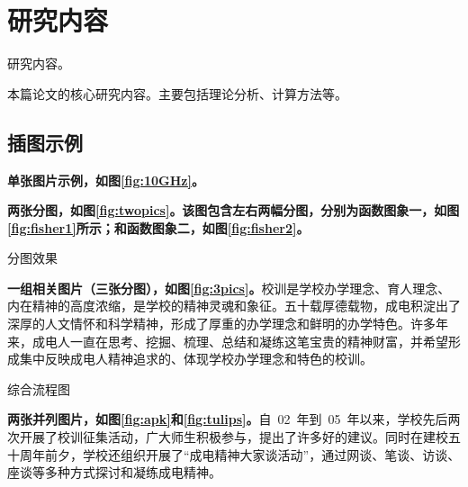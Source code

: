 
\chapter{研究内容}
	研究内容。
	
	本篇论文的核心研究内容。主要包括理论分析、计算方法等。

\section{插图示例}
    {\bfseries 单张图片示例，如图\ref{fig:10GHz}。}
    
    
    {\bfseries 两张分图，如图\ref{fig:twopics}。该图包含左右两幅分图，分别为函数图象一，如图\ref{fig:fisher1}所示；和函数图象二，如图\ref{fig:fisher2}。}
    
    \begin{pics}{分图效果}{\label{fig:twopics}}
    \end{pics}
    
    {\bfseries 一组相关图片（三张分图），如图\ref{fig:3pics}。}校训是学校办学理念、育人理念、内在精神的高度浓缩，是学校的精神灵魂和象征。五十载厚德载物，成电积淀出了深厚的人文情怀和科学精神，形成了厚重的办学理念和鲜明的办学特色。许多年来，成电人一直在思考、挖掘、梳理、总结和凝练这笔宝贵的精神财富，并希望形成集中反映成电人精神追求的、体现学校办学理念和特色的校训。
    
    \begin{pics}{综合流程图}{\label{fig:3pics}}
    \end{pics}
    
    {\bfseries 两张并列图片，如图\ref{fig:apk}和\ref{fig:tulips}。}自~02~年到~05~年以来，学校先后两次开展了校训征集活动，广大师生积极参与，提出了许多好的建议。同时在建校五十周年前夕，学校还组织开展了“成电精神大家谈活动”，通过网谈、笔谈、访谈、座谈等多种方式探讨和凝练成电精神。
    
    \begin{mpics}
    \end{mpics}
    
